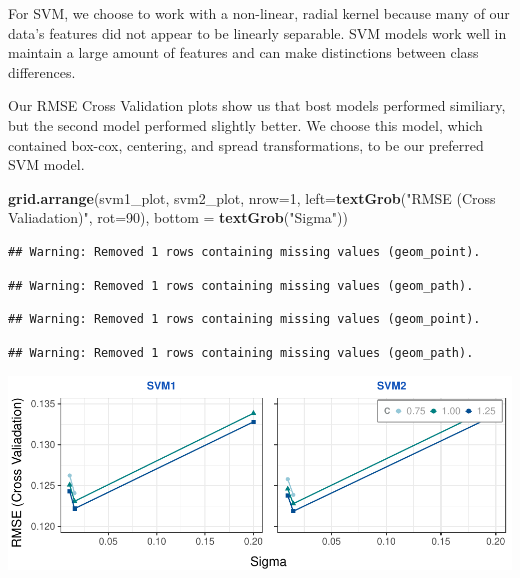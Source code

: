 \documentclass[]{report}
\newenvironment{Shaded}{\begin{snugshade}}{\end{snugshade}}
\newcommand{\DataTypeTok}[1]{\textcolor[rgb]{0.13,0.29,0.53}{#1}}
\newcommand{\DecValTok}[1]{\textcolor[rgb]{0.00,0.00,0.81}{#1}}
\newcommand{\KeywordTok}[1]{\textcolor[rgb]{0.13,0.29,0.53}{\textbf{#1}}}
\newcommand{\NormalTok}[1]{#1}
\newcommand{\StringTok}[1]{\textcolor[rgb]{0.31,0.60,0.02}{#1}}
\begin{document}
For SVM, we choose to work with a non-linear, radial kernel because many
of our data's features did not appear to be linearly separable. SVM
models work well in maintain a large amount of features and can make
distinctions between class differences.

Our RMSE Cross Validation plots show us that bost models performed
similiary, but the second model performed slightly better. We choose
this model, which contained box-cox, centering, and spread
transformations, to be our preferred SVM model.

\begin{Shaded}
\begin{Highlighting}[]
\KeywordTok{grid.arrange}\NormalTok{(svm1_plot, svm2_plot, }\DataTypeTok{nrow=}\DecValTok{1}\NormalTok{, }\DataTypeTok{left=}\KeywordTok{textGrob}\NormalTok{(}\StringTok{"RMSE (Cross Valiadation)"}\NormalTok{, }\DataTypeTok{rot=}\DecValTok{90}\NormalTok{), }\DataTypeTok{bottom =} \KeywordTok{textGrob}\NormalTok{(}\StringTok{"Sigma"}\NormalTok{))}
\end{Highlighting}
\end{Shaded}

\begin{verbatim}
## Warning: Removed 1 rows containing missing values (geom_point).
\end{verbatim}

\begin{verbatim}
## Warning: Removed 1 rows containing missing values (geom_path).
\end{verbatim}

\begin{verbatim}
## Warning: Removed 1 rows containing missing values (geom_point).
\end{verbatim}

\begin{verbatim}
## Warning: Removed 1 rows containing missing values (geom_path).
\end{verbatim}

\includegraphics{Proj2-JM_files/figure-latex/unnamed-chunk-6-1.pdf}
\end{document}
